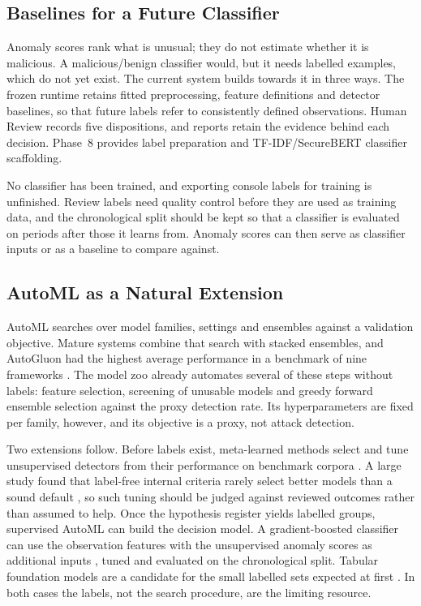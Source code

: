 \documentclass[11pt,a4paper]{article}
\begin{document}
\subsection{Baselines for a Future Classifier}\label{sec:core-classifier}

Anomaly scores rank what is unusual; they do not estimate whether it is malicious. A malicious/benign classifier would, but it needs labelled examples, which do not yet exist. The current system builds towards it in three ways. The frozen runtime retains fitted preprocessing, feature definitions and detector baselines, so that future labels refer to consistently defined observations. Human Review records five dispositions, and reports retain the evidence behind each decision. Phase~8 provides label preparation and TF-IDF/SecureBERT classifier scaffolding.

No classifier has been trained, and exporting console labels for training is unfinished. Review labels need quality control before they are used as training data, and the chronological split should be kept so that a classifier is evaluated on periods after those it learns from. Anomaly scores can then serve as classifier inputs or as a baseline to compare against.

\subsection{AutoML as a Natural Extension}\label{sec:core-automl}

AutoML searches over model families, settings and ensembles against a validation objective. Mature systems combine that search with stacked ensembles, and AutoGluon had the highest average performance in a benchmark of nine frameworks \cite{ref14}. The model zoo already automates several of these steps without labels: feature selection, screening of unusable models and greedy forward ensemble selection against the proxy detection rate. Its hyperparameters are fixed per family, however, and its objective is a proxy, not attack detection.

Two extensions follow. Before labels exist, meta-learned methods select and tune unsupervised detectors from their performance on benchmark corpora \cite{ref15}. A large study found that label-free internal criteria rarely select better models than a sound default \cite{ref16}, so such tuning should be judged against reviewed outcomes rather than assumed to help. Once the hypothesis register yields labelled groups, supervised AutoML can build the decision model. A gradient-boosted classifier can use the observation features with the unsupervised anomaly scores as additional inputs \cite{ref17}, tuned and evaluated on the chronological split. Tabular foundation models are a candidate for the small labelled sets expected at first \cite{ref18}. In both cases the labels, not the search procedure, are the limiting resource.
\end{document}
